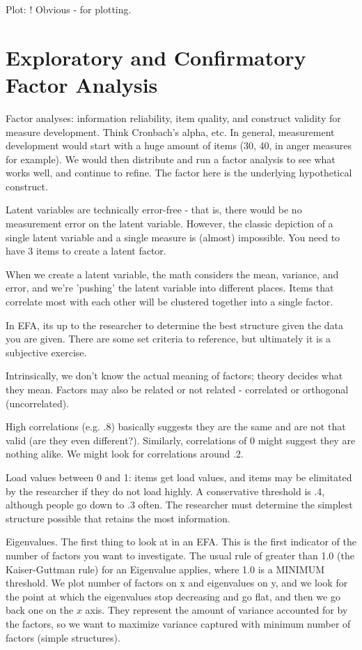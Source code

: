 \documentclass{article}
\begin{document}
Plot:
! Obvious - for plotting.

\section{Exploratory and Confirmatory Factor Analysis}

Factor analyses: information reliability, item quality, and construct validity for measure
development.
Think Cronbach's alpha, etc.
In general, measurement development would start with a huge amount of items (30, 40, in anger measures for example).
We would then distribute and run a factor analysis to see what works well, and continue to refine.
The factor here is the underlying hypothetical construct.

Latent variables are technically error-free - that is, there would be no measurement error on the latent variable.
However, the classic depiction of a single latent variable and a single measure is (almost) impossible. You need to have 3 items to create a latent factor.

When we create a latent variable, the math considers the mean, variance, and error, and we're 'pushing' the latent variable into different places.
Items that correlate most with each other will be clustered together into a single factor.

In EFA, its up to the researcher to determine the best structure given the data you are given.
There are some set criteria to reference, but ultimately it is a subjective exercise.

Intrinsically, we don't know the actual meaning of factors; theory decides what they mean.
Factors may also be related or not related - correlated or orthogonal (uncorrelated).

High correlations (e.g. .8) basically suggests they are the same and are not that valid (are they even different?).
Similarly, correlations of 0 might suggest they are nothing alike.
We might look for correlations around .2.

Load values between 0 and 1: items get load values, and items may be elimitated by the researcher if they do not load highly. 
A conservative threshold is .4, although people go down to .3 often.
The researcher must determine the simplest structure possible that retains the most information.

Eigenvalues.
The first thing to look at in an EFA.
This is the first indicator of the number of factors you want to investigate.
The usual rule of greater than 1.0 (the Kaiser-Guttman rule) for an Eigenvalue applies, where 1.0 is a MINIMUM threshold.
We plot number of factors on x and eigenvalues on y, and we look for the point at which the eigenvalues stop decreasing and go flat, and then we go back one on the $x$ axis.
They represent the amount of variance accounted for by the factors, so we want to maximize variance captured with minimum number of factors (simple structures).
\end{document}
